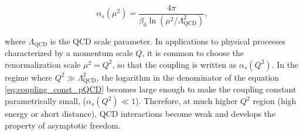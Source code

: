 \begin{equation}
\alpha_s(\mu^2)
=
\frac{4\pi}{\beta_0 \ln\!\left(\mu^2/\Lambda_{\mathrm{QCD}}^2\right)},
\label{eq:coupling_const_pQCD}
\end{equation}

where $\Lambda_{\mathrm{QCD}}$ is the \ac{QCD} scale parameter. In applications to physical processes characterized by a momentum scale $Q$, it is common to choose the renormalization scale $\mu^2 = Q^2$, so that the coupling is written as $\alpha_s(Q^2)$. In the regime where $Q^2 \gg \Lambda_{\mathrm{QCD}}^2$, the logarithm in the denominator of the equation \ref{eq:coupling_const_pQCD} becomes large enough to make the coupling constant parametrically small, ($\alpha_s(Q^2) \ll 1$). Therefore, at much higher $Q^2$ region (high energy or short distance), \ac{QCD} interactions become weak and develops the property of asymptotic freedom.


